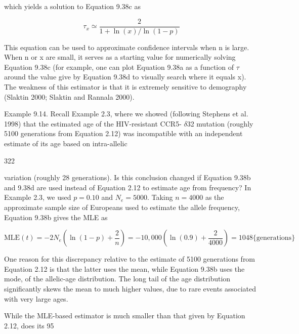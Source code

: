 \documentclass{article}
\begin{document}
which yields a solution to Equation 9.38c as

\begin{equation}
\tau_{x}\simeq\frac{2}{1+\ln(x)/\ln(1-p)}
\tag{9.38d}
\label{eq:9_38d}
\end{equation}

This equation can be used to approximate confidence intervals when n is large. When n or x are small, it serves as a starting value for numerically solving Equation 9.38c (for example, one can plot Equation 9.38a as a function of  $ \tau $ around the value give by Equation 9.38d to visually search where it equals x). The weakness of this estimator is that it is extremely sensitive to demography (Slaktin 2000; Slaktin and Rannala 2000).

Example 9.14. Recall Example 2.3, where we showed (following Stephens et al. 1998) that the estimated age of the HIV-resistant CCR5- $ \delta $32 mutation (roughly 5100 generations from Equation 2.12) was incompatible with an independent estimate of its age based on intra-allelic

322

variation (roughly 28 generations). Is this conclusion changed if Equation 9.38b and 9.38d are used instead of Equation 2.12 to estimate age from frequency? In Example 2.3, we used  $ p = 0.10 $ and  $ N_e = 5000 $. Taking  $ n = 4000 $ as the approximate sample size of Europeans used to estimate the allele frequency, Equation 9.38b gives the MLE as

\begin{equation}
\mathrm{MLE}(t)=-2N_{e}\left(\ln(1-p)+\frac{2}{n}\right)=-10,000\left(\ln(0.9)+\frac{2}{4000}\right)=1048\{\text{generations}\}
\end{equation}

One reason for this discrepancy relative to the estimate of 5100 generations from Equation 2.12 is that the latter uses the mean, while Equation 9.38b uses the mode, of the allelic-age distribution. The long tail of the age distribution significantly skews the mean to much higher values, due to rare events associated with very large ages.

While the MLE-based estimator is much smaller than that given by Equation 2.12, does its 95%
\end{document}
